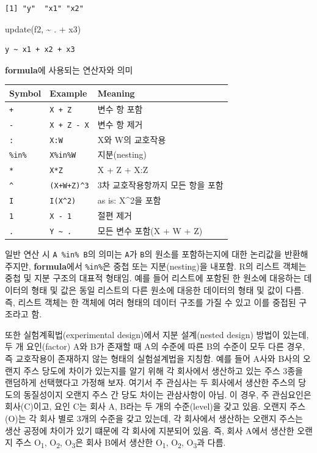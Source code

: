 \documentclass[
  11pt,
]{krantz}
\makeatletter
\newenvironment{Shaded}{\begin{snugshade}}{\end{snugshade}}
\newcommand{\FunctionTok}[1]{\textcolor[rgb]{0,0,0}{#1}}
\newcommand{\NormalTok}[1]{#1}
\newcommand{\SpecialCharTok}[1]{\textcolor[rgb]{0,0,0}{#1}}
\newenvironment{kframe}{%
\medskip{}
\setlength{\fboxsep}{.8em}
 \def\at@end@of@kframe{}%
 \ifinner\ifhmode%
  \def\at@end@of@kframe{\end{minipage}}%
  \begin{minipage}{\columnwidth}%
 \fi\fi%
 \def\FrameCommand##1{\hskip\@totalleftmargin \hskip-\fboxsep
 \colorbox{shadecolor}{##1}\hskip-\fboxsep
     \hskip-\linewidth \hskip-\@totalleftmargin \hskip\columnwidth}%
 \MakeFramed {\advance\hsize-\width
   \@totalleftmargin\z@ \linewidth\hsize
   \@setminipage}}%
 {\par\unskip\endMakeFramed%
 \at@end@of@kframe}
\newenvironment{rmdblock}[1]
  {
  \begin{itemize}
  \renewcommand{\labelitemi}{
    \raisebox{-.7\height}[0pt][0pt]{
      {\setkeys{Gin}{width=3em,keepaspectratio}\texttt{[image: images/\#1]}}
    }
  }
  \setlength{\fboxsep}{1em}
  \begin{kframe}
  \item
  }
  {
  \end{kframe}
  \end{itemize}
  }
\newenvironment{rmdtip}
  {\begin{rmdblock}{tip}}
  {\end{rmdblock}}
\makeatother
\begin{document}
\begin{verbatim}
[1] "y"  "x1" "x2"
\end{verbatim}

\begin{Shaded}
\begin{Highlighting}[]
\FunctionTok{update}\NormalTok{(f2, }\SpecialCharTok{\textasciitilde{}}\NormalTok{ . }\SpecialCharTok{+}\NormalTok{ x3)}
\end{Highlighting}
\end{Shaded}

\begin{verbatim}
y ~ x1 + x2 + x3
\end{verbatim}

\normalsize

\textbf{formula}에 사용되는 연산자와 의미

\begin{longtable}[]{@{}lll@{}}
\toprule
Symbol & Example & Meaning\tabularnewline
\midrule
\endhead
\texttt{+} & \texttt{X\ +\ Z} & 변수 항 포함\tabularnewline
\texttt{-} & \texttt{X\ +\ Z\ -\ X} & 변수 항 제거\tabularnewline
\texttt{:} & \texttt{X:W} & X와 W의 교호작용\tabularnewline
\texttt{\%in\%} & \texttt{X\%in\%W} & 지분(nesting)\tabularnewline
\texttt{*} & \texttt{X*Z} & X + Z + X:Z\tabularnewline
\texttt{\^{}} & \texttt{(X+W+Z)\^{}3} & 3차 교호작용항까지 모든 항을 포함\tabularnewline
\texttt{I} & \texttt{I(X\^{}2)} & as is: X\^{}2을 포함\tabularnewline
\texttt{1} & \texttt{X\ -\ 1} & 절편 제거\tabularnewline
\texttt{.} & \texttt{Y\ \textasciitilde{}\ .} & 모든 변수 포함(X + W + Z)\tabularnewline
\bottomrule
\end{longtable}

\footnotesize

\begin{rmdtip}
일반 연산 시 \texttt{A\ \%in\%\ B}의 의미는 \texttt{A}가 \texttt{B}의 원소를 포함하는지에 대한 논리값을 반환해 주지만, \textbf{formula}에서 \texttt{\%in\%}은 중첩 또는 지분(nesting)을 내포함.
R의 리스트 객체는 중첩 및 지분 구조의 대표적 형태임. 예를 들어 리스트에 포함된 한 원소에 대응하는 데이터의 형태 및 값은 동일 리스트의 다른 원소에 대응한
데이터의 형태 및 값이 다름. 즉, 리스트 객체는 한 객체에 여러 형태의 데이터 구조를 가질 수 있고 이를 중접된 구조라고 함.

또한 실험계획법(experimental design)에서 지분 설계(nested design) 방법이 있는데, 두 개 요인(factor) A와 B가 존재할 때 A의 수준에 따른 B의 수준이 모두 다른 경우,
즉 교호작용이 존재하지 않는 형태의 실험설계법을 지칭함. 예를 들어 A사와 B사의 오랜지 주스 당도에 차이가 있는지를 알기 위해 각 회사에서 생산하고 있는 주스 3종을
랜덤하게 선택했다고 가정해 보자. 여기서 주 관심사는 두 회사에서 생산한 주스의 당도의 동질성이지 오랜지 주스 간 당도 차이는 관삼사항이 아님. 이 경우,
주 관심요인은 회사(C)이고, 요인 C는 회사 A, B라는 두 개의 수준(level)을 갖고 있음. 오랜지 주스(O)는 각 회사 별로 3개의 수준을 갖고 있는데,
각 회사에서 생산하는 오랜지 주스는 생산 공정에 차이가 있기 떄문에 각 회사에 지분되어 있음. 즉, 회사 A에서 생산한 오랜지 주스 O\textsubscript{1}, O\textsubscript{2}, O\textsubscript{3}은
회사 B에서 생산한 O\textsubscript{1}, O\textsubscript{2}, O\textsubscript{3}과 다름.
\end{rmdtip}
\end{document}

